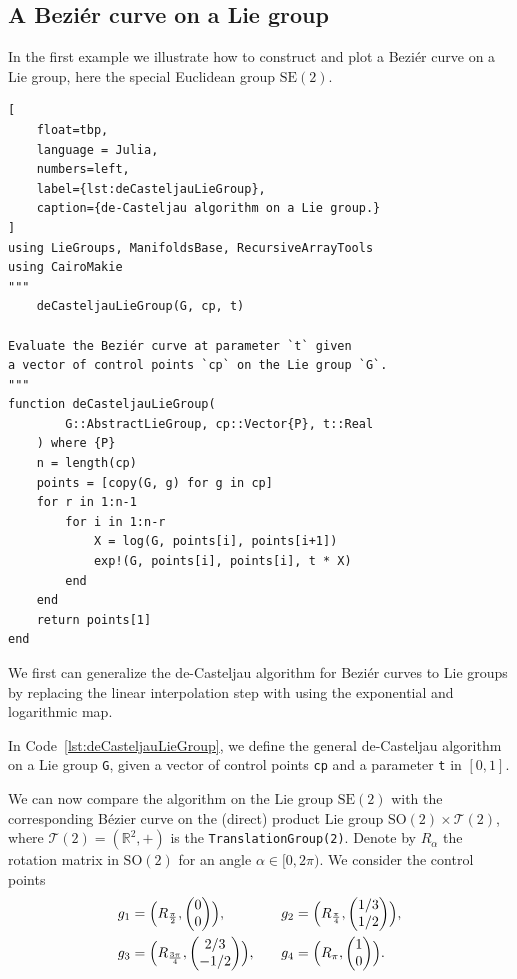 \documentclass{juliacon}
\begin{document}
\subsection{A Beziér curve on a Lie group}

In the first example we illustrate how to construct and plot a Beziér curve on a Lie group, here the special Euclidean group \(\mathrm{SE}(2)\).


\begin{lstlisting}[
    float=tbp,
    language = Julia,
    numbers=left,
    label={lst:deCasteljauLieGroup},
    caption={de-Casteljau algorithm on a Lie group.}
]
using LieGroups, ManifoldsBase, RecursiveArrayTools
using CairoMakie
"""
    deCasteljauLieGroup(G, cp, t)

Evaluate the Beziér curve at parameter `t` given
a vector of control points `cp` on the Lie group `G`.
"""
function deCasteljauLieGroup(
        G::AbstractLieGroup, cp::Vector{P}, t::Real
    ) where {P}
    n = length(cp)
    points = [copy(G, g) for g in cp]
    for r in 1:n-1
        for i in 1:n-r
            X = log(G, points[i], points[i+1])
            exp!(G, points[i], points[i], t * X)
        end
    end
    return points[1]
end
\end{lstlisting}

We first can generalize the de-Casteljau algorithm for Beziér curves to Lie groups by replacing the linear interpolation step with using the exponential and logarithmic map.

In Code~\ref{lst:deCasteljauLieGroup}, we define the general de-Casteljau algorithm on a Lie group \verb|G|, given a vector of control points \verb|cp| and a parameter \verb|t| in \([0,1]\).

We can now compare the algorithm on the Lie group \(\mathrm{SE}(2)\) with the corresponding Bézier curve on the (direct) product Lie group $\mathrm{SO}(2) \times \mathcal T(2)$, where \(\mathcal T(2) = (\mathbb{R}^2, +)\) is the \verb|TranslationGroup(2)|.
Denote by $R_\alpha$ the rotation matrix in \(\mathrm{SO}(2)\) for an angle \(\alpha\in[0,2\pi)\).
We consider the control points
\begin{align*}
    g_1 &= \Bigl(R_{\frac{\pi}{2}}, \begin{pmatrix} 0 \\ 0 \end{pmatrix}\Bigr),
    &\quad
    g_2 &= \Bigl(R_{\frac{\pi}{4}}, \begin{pmatrix} 1/3 \\ 1/2 \end{pmatrix}\Bigr),
    \\%
    g_3 &= \Bigl(R_{\frac{3\pi}{4}}, \begin{pmatrix} 2/3 \\ -1/2 \end{pmatrix}\Bigr),
    &\quad
    g_4 &= \Bigl(R_{\pi}, \begin{pmatrix} 1 \\ 0 \end{pmatrix}\Bigr).
\end{align*}
\end{document}
